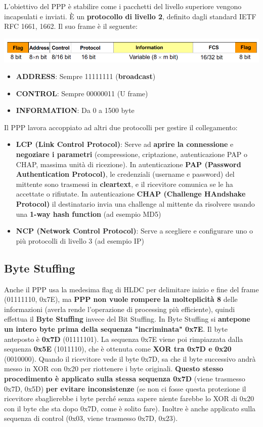 \documentclass[12pt]{article}
\begin{document}
L'obiettivo del PPP è stabilire come i pacchetti del livello superiore vengono incapsulati e inviati. È un \textbf{protocollo di livello 2}, definito dagli standard IETF RFC 1661, 1662. Il suo frame è il seguente:
\begin{center}
    \includegraphics[scale=0.35]{ppp_frame}
\end{center}
\begin{itemize}
    \item \textbf{ADDRESS}: Sempre 11111111 (\textbf{broadcast})
    \item \textbf{CONTROL}: Sempre 00000011 (U frame)
    \item \textbf{INFORMATION}: Da 0 a 1500 byte
\end{itemize}
Il PPP lavora accoppiato ad altri due protocolli per gestire il collegamento:
\begin{itemize}
    \item \textbf{LCP (Link Control Protocol)}: Serve ad \textbf{aprire la connessione} e \textbf{negoziare i parametri} (compressione, criptazione, autenticazione PAP o CHAP, massima unità di ricezione). In autenticazione \textbf{PAP (Password Authentication Protocol)}, le credenziali (username e password) del mittente sono trasmessi in \textbf{cleartext}, e il ricevitore comunica se le ha accettate o rifiutate. In autenticazione \textbf{CHAP (Challenge HAndshake Protocol)} il destinatario invia una challenge al mittente da risolvere usando una \textbf{1-way hash function} (ad esempio MD5)
    \item \textbf{NCP (Network Control Protocol)}: Serve a scegliere e configurare uno o più protocolli di livello 3 (ad esempio IP)
\end{itemize}

\subsection{Byte Stuffing}

Anche il PPP usa la medesima flag di HLDC per delimitare inizio e fine del frame (01111110, 0x7E), ma \textbf{PPP non vuole rompere la molteplicità 8} delle informazioni (averla rende l'operazione di processing più efficiente), quindi effettua il \textbf{Byte Stuffing} invece del Bit Stuffing. In Byte Stuffing si \textbf{antepone un intero byte prima della sequenza "incriminata" 0x7E}. Il byte anteposto è \textbf{0x7D} (01111101). La sequenza 0x7E viene poi rimpiazzata dalla sequenza \textbf{0x5E} (1011110), che è ottenuta come \textbf{XOR tra 0x7D e 0x20} (0010000). Quando il ricevitore vede il byte 0x7D, sa che il byte successivo andrà messo in XOR con 0x20 per riottenere i byte originali. \textbf{Questo stesso procedimento è applicato sulla stessa sequenza 0x7D} (viene trasmesso 0x7D, 0x5D) \textbf{per evitare inconsistenze} (se non ci fosse questa protezione il ricevitore sbaglierebbe i byte perché senza sapere niente farebbe lo XOR di 0x20 con il byte che sta dopo 0x7D, come è solito fare). Inoltre è anche applicato sulla sequenza di control (0x03, viene trasmesso 0x7D, 0x23).
\end{document}
